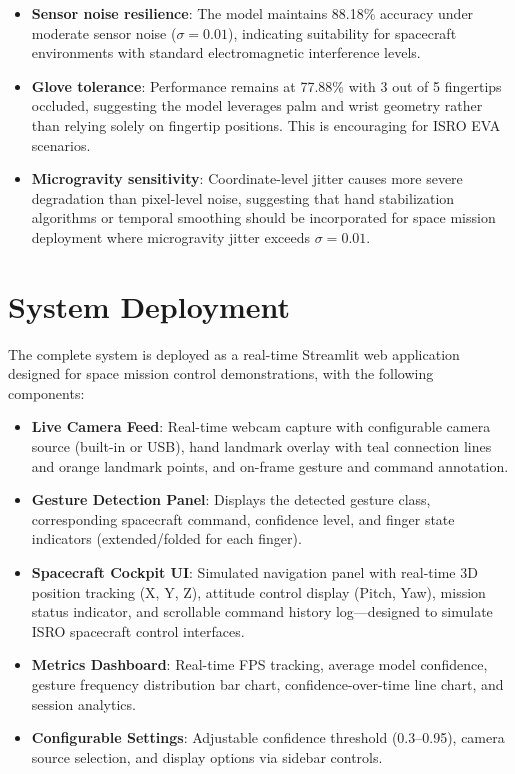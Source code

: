 \documentclass[conference]{IEEEtran}
\begin{document}
\begin{itemize}
    \item \textbf{Sensor noise resilience}: The model maintains 88.18\% accuracy under moderate sensor noise ($\sigma=0.01$), indicating suitability for spacecraft environments with standard electromagnetic interference levels.
    \item \textbf{Glove tolerance}: Performance remains at 77.88\% with 3 out of 5 fingertips occluded, suggesting the model leverages palm and wrist geometry rather than relying solely on fingertip positions. This is encouraging for ISRO EVA scenarios.
    \item \textbf{Microgravity sensitivity}: Coordinate-level jitter causes more severe degradation than pixel-level noise, suggesting that hand stabilization algorithms or temporal smoothing should be incorporated for space mission deployment where microgravity jitter exceeds $\sigma=0.01$.
\end{itemize}

\section{System Deployment}

The complete system is deployed as a real-time Streamlit web application \cite{ref_streamlit} designed for space mission control demonstrations, with the following components:

\begin{itemize}
    \item \textbf{Live Camera Feed}: Real-time webcam capture with configurable camera source (built-in or USB), hand landmark overlay with teal connection lines and orange landmark points, and on-frame gesture and command annotation.
    \item \textbf{Gesture Detection Panel}: Displays the detected gesture class, corresponding spacecraft command, confidence level, and finger state indicators (extended/folded for each finger).
    \item \textbf{Spacecraft Cockpit UI}: Simulated navigation panel with real-time 3D position tracking (X, Y, Z), attitude control display (Pitch, Yaw), mission status indicator, and scrollable command history log—designed to simulate ISRO spacecraft control interfaces.
    \item \textbf{Metrics Dashboard}: Real-time FPS tracking, average model confidence, gesture frequency distribution bar chart, confidence-over-time line chart, and session analytics.
    \item \textbf{Configurable Settings}: Adjustable confidence threshold (0.3--0.95), camera source selection, and display options via sidebar controls.
\end{itemize}
\end{document}
